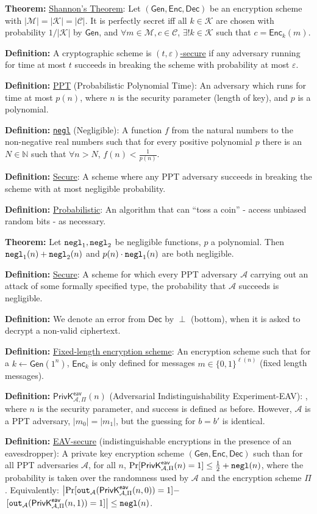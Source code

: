 \documentclass[10pt]{article}
\newcommand{\N}{\mathbb{N}}
\newcommand{\AAA}{\mathcal{A}}
\newcommand{\CCC}{\mathcal{C}}
\newcommand{\KKK}{\mathcal{K}}
\newcommand{\MMM}{\mathcal{M}}
\newcommand{\defn}[1]{{\bf Definition:} \underline{#1}}
\newcommand{\thm}[1]{{\bf Theorem:} \underline{#1}}
\newcommand{\Enc}{\mathsf{Enc}}
\newcommand{\Dec}{\mathsf{Dec}}
\newcommand{\Gen}{\mathsf{Gen}}
\newcommand{\GenEncDec}{(\Gen,\Enc,\Dec)}
\newcommand{\ExptEavArgs}[2]{\mathsf{PrivK}^{\mathsf{eav}}_{#1,#2}}
\newcommand{\ExptEav}{\ExptEavArgs{\AAA}{\Pi}}
\newcommand{\negl}{{\tt negl}}
\newcommand{\from}{\leftarrow}
\begin{document}
\begin{multicols}{5}
\thm{Shannon's Theorem}: Let $\GenEncDec$ be an encryption scheme with $|\MMM|=|\KKK|=|\CCC|$. It is perfectly secret iff all $k\in\KKK$ are chosen with probability $1/|\KKK|$ by $\Gen$, and $\forall m\in\MMM, c\in\CCC$, $\exists!k\in\KKK$ such that $c=\Enc_k(m)$.

\defn{}A cryptographic scheme is \underline{$(t,\varepsilon)$-secure} if any adversary running for time at most $t$ succeeds in breaking the scheme with probability at most $\varepsilon$.

\defn{PPT} (Probabilistic Polynomial Time): An adversary which runs for time at most $p(n)$, where $n$ is the security parameter (length of key), and $p$ is a polynomial.

\defn{\negl} (Negligible): A function $f$ from the natural numbers to the non-negative real numbers such that for every positive polynomial $p$ there is an $N\in\N$ such that $\forall n>N$, $f(n)<\frac{1}{p(n)}$.

\defn{Secure}: A scheme where any PPT adversary succeeds in breaking the scheme with at most negligible probability.

\defn{Probabilistic}: An algorithm that can ``toss a coin'' - access unbiased random bits - as necessary.

\thm{}Let $\negl_1,\negl_2$ be negligible functions, $p$ a polynomial. Then $\negl_1(n)+\negl_2(n)$ and $p(n)\cdot\negl_1(n)$ are both negligible.

\defn{Secure}: A scheme for which every PPT adversary $\AAA$ carrying out an attack of some formally specified type, the probability that $\AAA$ succeeds is negligible.

\defn{}We denote an error from $\Dec$ by $\perp$ (bottom), when it is asked to decrypt a non-valid ciphertext.

\defn{Fixed-length encryption scheme}: An encryption scheme such that for a $k\from\Gen(1^n)$, $\Enc_k$ is only defined for messages $m\in\{0,1\}^{\ell(n)}$ (fixed length messages).

\defn{$\ExptEav(n)$} (Adversarial Indistinguishability Experiment-EAV): , where $n$ is the security parameter, and success is defined as before. However, $\AAA$ is a PPT adversary, $|m_0|=|m_1|$, but the guessing for $b=b'$ is identical.

\defn{EAV-secure} (indistinguishable encryptions in the presence of an eavesdropper): A private key encryption scheme $\GenEncDec$ such than for all PPT adversaries $\AAA$, for all $n$, $\Pr[\ExptEav(n)=1]\leq\frac{1}{2}+\negl(n)$, where the probability is taken over the randomness used by $\AAA$ and the encryption scheme $\Pi$. Equivalently: $\left|\Pr[{\tt out}_{\AAA}(\ExptEav(n,0))=1]-\right.$ $\left.[{\tt out}_{\AAA}(\ExptEav(n,1))=1]\right|\leq\negl(n)$.


\end{multicols}
\end{document}
